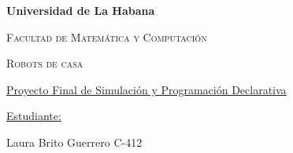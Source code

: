 \documentclass{book}
\begin{document}
	\begin{titlepage}
		\centering
		{\bfseries\LARGE Universidad de La Habana \par }
		\vspace{1cm}
		{\scshape\LARGE Facultad de Matem\'atica y Computaci\'on \par}
		\vspace{3cm}
		{\scshape\Huge Robots de casa \par}
		{\Large \underline{Proyecto Final de Simulaci\'on y Programaci\'on Declarativa} \par}
		\vspace{3cm}
		\vfill
		{\Large \underline{Estudiante:} \par}
		{\Large Laura Brito Guerrero C-412 \par}
		\vfill
	\end{titlepage}
	
\end{document}
